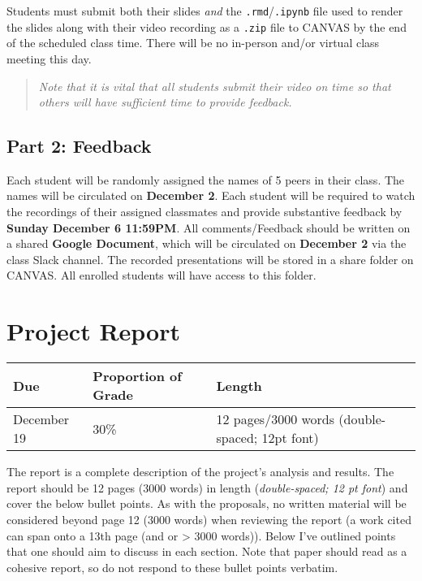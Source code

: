 \documentclass[
  12pt,
]{article}
\begin{document}
Students must submit both their slides \emph{and} the
\texttt{.rmd}/\texttt{.ipynb} file used to render the slides along with
their video recording as a \texttt{.zip} file to CANVAS by the end of
the scheduled class time. There will be no in-person and/or virtual
class meeting this day.

\begin{quote}
\emph{Note that it is vital that all students submit their video on time
so that others will have sufficient time to provide feedback.}
\end{quote}

\hypertarget{part-2-feedback}{%
\subsection{Part 2: Feedback}\label{part-2-feedback}}

Each student will be randomly assigned the names of 5 peers in their
class. The names will be circulated on \textbf{December 2}. Each student
will be required to watch the recordings of their assigned classmates
and provide substantive feedback by \textbf{Sunday December 6 11:59PM}.
All comments/Feedback should be written on a shared \textbf{Google
Document}, which will be circulated on \textbf{December 2} via the class
Slack channel. The recorded presentations will be stored in a share
folder on CANVAS. All enrolled students will have access to this folder.

\hypertarget{project-report}{%
\section{Project Report}\label{project-report}}

\begin{longtable}[]{@{}lll@{}}
\toprule
\textbf{Due} & \textbf{Proportion of Grade} &
\textbf{Length}\tabularnewline
\midrule
\endhead
December 19 & 30\% & 12 pages/3000 words (double-spaced; 12pt
font)\tabularnewline
\bottomrule
\end{longtable}

The report is a complete description of the project's analysis and
results. The report should be 12 pages (3000 words) in length
(\emph{double-spaced; 12 pt font}) and cover the below bullet points. As
with the proposals, no written material will be considered beyond page
12 (3000 words) when reviewing the report (a work cited can span onto a
13th page (and or \textgreater{} 3000 words)). Below I've outlined
points that one should aim to discuss in each section. Note that paper
should read as a cohesive report, so do not respond to these bullet
points verbatim.
\end{document}
